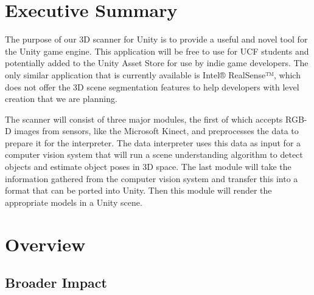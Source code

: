\documentclass[12pt]{article}
\begin{document}
\setcounter{tocdepth}{3}
\tableofcontents

\cleardoublepage
{} %

\section{Executive Summary}\label{executive-summary}

The purpose of our 3D scanner for Unity is to provide a useful and novel
tool for the Unity game engine. This application will be free to use for
UCF students and potentially added to the Unity Asset Store for use by
indie game developers. The only similar application that is currently
available is Intel® RealSense™, which does not offer the 3D scene
segmentation features to help developers with level creation that we are
planning.

The scanner will consist of three major modules, the first of which
accepts RGB-D images from sensors, like the Microsoft Kinect, and
preprocesses the data to prepare it for the interpreter. The data
interpreter uses this data as input for a computer vision system that
will run a scene understanding algorithm to detect objects and estimate
object poses in 3D space. The last module will take the information
gathered from the computer vision system and transfer this into a format
that can be ported into Unity. Then this module will render the
appropriate models in a Unity scene.

\section{Overview}\label{overview}

\subsection{Broader Impact}\label{broader-impact}
\end{document}

